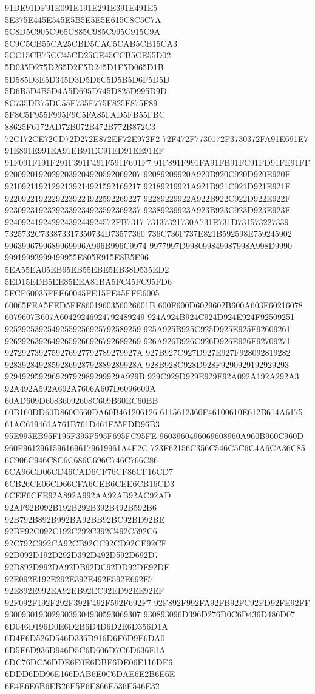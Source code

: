 91DE91DF91E091E191E291E391E491E5
5E375E445E545E5B5E5E5E615C8C5C7A
5C8D5C905C965C885C985C995C915C9A
5C9C5CB55CA25CBD5CAC5CAB5CB15CA3
5CC15CB75CC45CD25CE45CCB5CE55D02
5D035D275D265D2E5D245D1E5D065D1B
5D585D3E5D345D3D5D6C5D5B5D6F5D5D
5D6B5D4B5D4A5D695D745D825D995D9D
8C735DB75DC55F735F775F825F875F89
5F8C5F955F995F9C5FA85FAD5FB55FBC
88625F6172AD72B072B472B772B872C3
72C172CE72CD72D272E872EF72E972F2
72F472F7730172F3730372FA91E691E7
91E891E991EA91EB91EC91ED91EE91EF
91F091F191F291F391F491F591F691F7
91F891F991FA91FB91FC91FD91FE91FF
92009201920292039204920592069207
92089209920A920B920C920D920E920F
92109211921292139214921592169217
92189219921A921B921C921D921E921F
92209221922292239224922592269227
92289229922A922B922C922D922E922F
92309231923292339234923592369237
92389239923A923B923C923D923E923F
92409241924292439244924572FB7317
73137321730A731E731D731573227339
7325732C733873317350734D73577360
736C736F737E821B592598E759245902
9963996799689969996A996B996C9974
9977997D998099849987998A998D9990
99919993999499955E805E915E8B5E96
5EA55EA05EB95EB55EBE5EB38D535ED2
5ED15EDB5EE85EEA81BA5FC45FC95FD6
5FCF60035FEE60045FE15FE45FFE6005
60065FEA5FED5FF8601960356026601B
600F600D6029602B600A603F60216078
6079607B607A60429246924792489249
924A924B924C924D924E924F92509251
92529253925492559256925792589259
925A925B925C925D925E925F92609261
92629263926492659266926792689269
926A926B926C926D926E926F92709271
9272927392759276927792789279927A
927B927C927D927E927F928092819282
9283928492859286928792889289928A
928B928C928D928F9290929192929293
929492959296929792989299929A929B
929C929D929E929F92A092A192A292A3
92A492A592A692A7606A607D6096609A
60AD609D60836092608C609B60EC60BB
60B160DD60D860C660DA60B461206126
6115612360F46100610E612B614A6175
61AC619461A761B761D461F55FDD96B3
95E995EB95F195F395F595F695FC95FE
9603960496069608960A960B960C960D
960F96129615961696179619961A4E2C
723F62156C356C546C5C6C4A6CA36C85
6C906C946C8C6C686C696C746C766C86
6CA96CD06CD46CAD6CF76CF86CF16CD7
6CB26CE06CD66CFA6CEB6CEE6CB16CD3
6CEF6CFE92A892A992AA92AB92AC92AD
92AF92B092B192B292B392B492B592B6
92B792B892B992BA92BB92BC92BD92BE
92BF92C092C192C292C392C492C592C6
92C792C992CA92CB92CC92CD92CE92CF
92D092D192D292D392D492D592D692D7
92D892D992DA92DB92DC92DD92DE92DF
92E092E192E292E392E492E592E692E7
92E892E992EA92EB92EC92ED92EE92EF
92F092F192F292F392F492F592F692F7
92F892F992FA92FB92FC92FD92FE92FF
93009301930293039304930593069307
930893096D396D276D0C6D436D486D07
6D046D196D0E6D2B6D4D6D2E6D356D1A
6D4F6D526D546D336D916D6F6D9E6DA0
6D5E6D936D946D5C6D606D7C6D636E1A
6DC76DC56DDE6E0E6DBF6DE06E116DE6
6DDD6DD96E166DAB6E0C6DAE6E2B6E6E
6E4E6E6B6EB26E5F6E866E536E546E32
